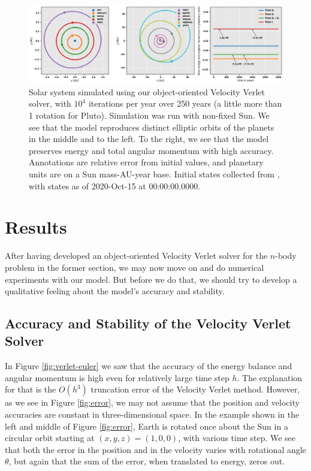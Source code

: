 \documentclass[]{article}
\begin{document}
\begin{figure}[!htb]
	\centering
	\includegraphics[width=1\linewidth]{solar-system.png}
	\caption{Solar system simulated using our object-oriented Velocity Verlet solver, with $10^4$ iterations per year over 250 years (a little more than 1 rotation for Pluto). Simulation was run with non-fixed Sun. We see that the model reproduces distinct elliptic orbits of the planets in the middle and to the left. To the right, we see that the model preserves energy and total angular momentum with high accuracy. Annotations are relative error from initial values, and planetary units are on a Sun mass-AU-year base. Initial states collected from \cite{nasa-jpl}, with states as of 2020-Oct-15 at 00:00:00.0000.}
	\label{fig:solar-system}
\end{figure}


\section{Results} \label{results}
After having developed an object-oriented Velocity Verlet solver for the $n$-body problem in the former section, we may now move on and do numerical experiments with our model. But before we do that, we should try to develop a qualitative feeling about the model's accuracy and stability.

\subsection{Accuracy and Stability of the Velocity Verlet Solver}
In Figure \ref{fig:verlet-euler} we saw that the accuracy of the energy balance and angular momentum is high even for relatively large time step $h$. The explanation for that is the $O(h^3)$ truncation error of the Velocity Verlet method. However, as we see in Figure \ref{fig:error}, we may not assume that the position and velocity accuracies are constant in three-dimensional space. In the example shown in the left and middle of Figure \ref{fig:error}, Earth is rotated once about the Sun in a circular orbit starting at $(x,y,z)=(1,0,0)$, with various time step. We see that both the error in the position and in the velocity varies with rotational angle $\theta$, but again that the sum of the error, when translated to energy, zeros out.
\end{document}
